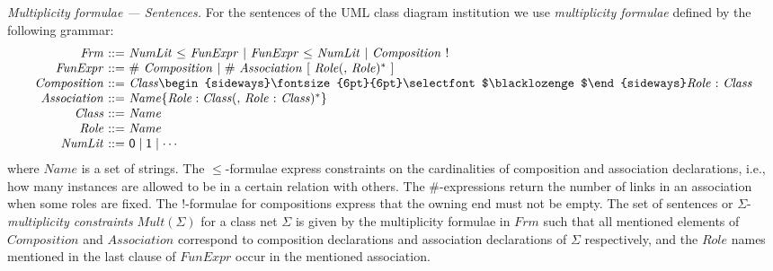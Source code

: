 \documentclass[10pt,fleqn,%
\ifpretendfinal
final%
\else
draft%
\fi,
]{scrreprt}
\newcommand{\composition}{\raisebox{0.2pt}{\begin{sideways}\fontsize{6pt}{6pt}\selectfont$\blacklozenge$\end{sideways}}}
\begin{document}
\smallskip\noindent
\textit{Multiplicity formulae --- Sentences.}
For the sentences of the UML class diagram institution we use
\emph{multiplicity formulae} defined by the following grammar:
%
\begin{equation*}
\begin{array}{@{}r@{\ }r@{\ }l@{}}
  \mathit{Frm} & ::= & \mathit{NumLit}\ \mathsf{\leq}\ \mathit{FunExpr}\ |\ \mathit{FunExpr}\ \mathsf{\leq}\ \mathit{NumLit}\ |\ \mathit{Composition}\ \mathsf{!}
\\
  \mathit{FunExpr} & ::= & \mathit{\#}\ \mathit{Composition}\ | \ \mathit{\#}\ \mathit{Association}\ \mathsf{[}\ \mathit{Role} (\mathsf{,}\ \mathit{Role})^*\ \mathsf{]}
\\
  \mathit{Composition} & ::= & \mathit{Class}\composition\mathit{Role}\ \mathsf{:}\ \mathit{Class}
\\
  \mathit{Association} & ::= & \mathit{Name}\{ \mathit{Role} : \mathit{Class} (\mathsf{,}\ \mathit{Role}\ \mathsf{:}\ \mathit{Class})^* \}
\\
  \mathit{Class} & ::= & \mathit{Name}
\\
  \mathit{Role} & ::= & \mathit{Name}
\\
  \mathit{NumLit} & ::= & \mathsf{0} \mid \mathsf{1} \mid \cdots
\end{array}
\end{equation*}
%
where $\mathit{Name}$ is a set of strings.  The $\leq$-formulae
express constraints on the cardinalities of composition and
association declarations, i.e., how many instances are allowed to be
in a certain relation with others.  The $\#$-expressions return the
number of links in an association when some roles are fixed.  The
$!$-formulae for compositions express that the owning end must not be
empty.
%
The set of sentences or $\Sigma$-\emph{multiplicity constraints}
$\mathit{Mult}(\Sigma)$ for a class net $\Sigma$ is given by the
multiplicity formulae in $\mathit{Frm}$ such that all mentioned
elements of $\mathit{Composition}$ and $\mathit{Association}$
correspond to composition declarations and association declarations of
$\Sigma$ respectively, and the $\mathit{Role}$ names mentioned in the
last clause of $\mathit{FunExpr}$ occur in the mentioned association.
\end{document}
